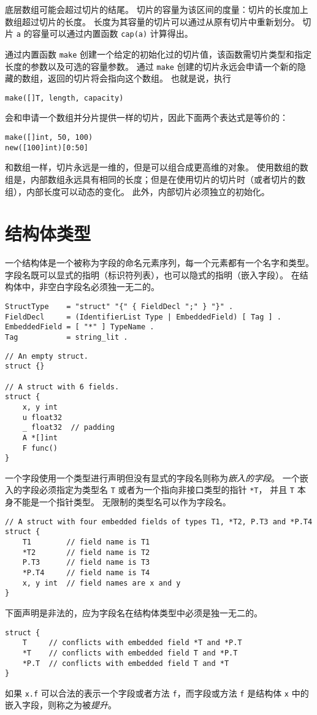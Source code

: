 底层数组可能会超过切片的结尾。
切片的容量为该区间的度量：切片的长度加上数组超过切片的长度。
长度为其容量的切片可以通过从原有切片中重新划分。%
切片 \lstinline|a| 的容量可以通过内置函数 \lstinline|cap(a)| 计算得出。

通过内置函数 \lstinline|make| 创建一个给定的初始化过的切片值，该函数需切片类型和指定长度的参数以及可选的容量参数。
通过 \lstinline|make| 创建的切片永远会申请一个新的隐藏的数组，返回的切片将会指向这个数组。
也就是说，执行
\begin{lstlisting}[style=golang]
make([]T, length, capacity)
\end{lstlisting}
会和申请一个数组并分片提供一样的切片，因此下面两个表达式是等价的：
\begin{lstlisting}
make([]int, 50, 100)
new([100]int)[0:50]
\end{lstlisting}
和数组一样，切片永远是一维的，但是可以组合成更高维的对象。
使用数组的数组是，内部数组永远具有相同的长度；但是在使用切片的切片时（或者切片的数组），内部长度可以动态的变化。
此外，内部切片必须独立的初始化。

\section{结构体类型}
一个结构体是一个被称为字段的命名元素序列，每一个元素都有一个名字和类型。
字段名既可以显式的指明（标识符列表），也可以隐式的指明（嵌入字段）。
在结构体中，非空白字段名必须独一无二的。
\begin{lstlisting}[style=EBNF]
StructType    = "struct" "{" { FieldDecl ";" } "}" .
FieldDecl     = (IdentifierList Type | EmbeddedField) [ Tag ] .
EmbeddedField = [ "*" ] TypeName .
Tag           = string_lit .
\end{lstlisting}

\begin{lstlisting}[style=golang]
// An empty struct.
struct {}

// A struct with 6 fields.
struct {
	x, y int
	u float32
	_ float32  // padding
	A *[]int
	F func()
}
\end{lstlisting}
一个字段使用一个类型进行声明但没有显式的字段名则称为\emph{嵌入的字段}。
一个嵌入的字段必须指定为类型名 \lstinline|T| 或者为一个指向非接口类型的指针 \lstinline|*T|，
并且 \lstinline|T| 本身不能是一个指针类型。
无限制的类型名可以作为字段名。
\begin{lstlisting}[style=golang]
// A struct with four embedded fields of types T1, *T2, P.T3 and *P.T4
struct {
	T1        // field name is T1
	*T2       // field name is T2
	P.T3      // field name is T3
	*P.T4     // field name is T4
	x, y int  // field names are x and y
}
\end{lstlisting}
下面声明是非法的，应为字段名在结构体类型中必须是独一无二的。
\begin{lstlisting}[style=golang]
struct {
	T     // conflicts with embedded field *T and *P.T
	*T    // conflicts with embedded field T and *P.T
	*P.T  // conflicts with embedded field T and *T
}
\end{lstlisting}
如果 \lstinline|x.f| 可以合法的表示一个字段或者方法 \lstinline|f|，而字段或方法 \lstinline|f| 是结构体 \lstinline|x| 中的嵌入字段，则称之为被\emph{提升}。

